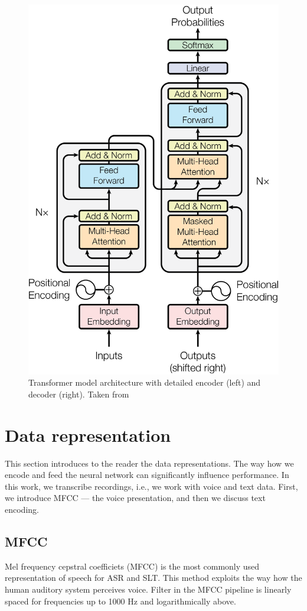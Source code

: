 \begin{figure}[h]
	\centering
	\includegraphics[width=0.8\linewidth]{img/ModalNet-21.png}
	\caption{Transformer model architecture with detailed encoder (left) and decoder (right). Taken from }
	\label{fig:transformer}
\end{figure}

\section{Data representation}
This section introduces to the reader the data representations. The way how we encode and feed the neural network can significantly influence performance. In this work, we transcribe recordings, i.e., we work with voice and text data. First, we introduce MFCC --- the voice presentation, and then we discuss text encoding.

\subsection{MFCC}
\label{mfcc}
Mel frequency cepstral coefficiets (MFCC) is the most commonly used representation of speech for ASR and SLT. 
This method exploits the way how the human auditory system perceives voice. Filter in the MFCC pipeline is linearly spaced for frequencies up to 1000 Hz and logarithmically above. 

